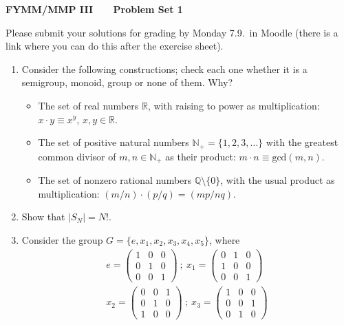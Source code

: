 \documentclass[12pt]{article}
\newcommand{\R} {\mathbb{R}}
\newcommand{\N} {\mathbb{N}}
\newcommand{\Q} {\mathbb{Q}}
\begin{document}
\normalsize

\baselineskip 14pt

\begin{center}
{\Large {\bf FYMM/MMP III \ \ \  Problem Set 1}}
\end{center}

\noindent
Please submit your solutions for grading by Monday 7.9.\ in Moodle (there is a link where you can do this after the exercise sheet).

\begin{enumerate}
\item Consider the following constructions; check each one whether it is a semigroup, monoid, group or
none of them. Why?
\begin{itemize}
\item The set of real numbers $\R$, with raising to power as multiplication:
$x\cdot y \equiv x^y$, $x,y\in \R$.
\item The set of positive natural numbers $\N_+=\{1,2,3,\ldots \}$ with the greatest common
divisor of $m,n\in \N_+$ as their product: $m\cdot n \equiv \text{gcd}(m,n)$.
\item The set of nonzero rational numbers $\Q\setminus\{0\}$, with the usual product
as multiplication: $(m/n) \cdot (p/q)
= (mp/nq)$.
\end{itemize}
\item Show that $|S_N|=N!$.
\item Consider the group $G=\{e,x_1,x_2,x_3,x_4,x_5\}$, where
\begin{eqnarray*}
e=\left( \begin{array}{ccc} 1 & 0 & 0 \\ 0 & 1 & 0 \\ 0 & 0 & 1
\end{array}\right) \ ; \
x_1 = \left( \begin{array}{ccc} 0 & 1 & 0 \\ 1 & 0 & 0 \\ 0 & 0 & 1
\end{array}\right) \\
x_2 = \left( \begin{array}{ccc} 0 & 0 & 1 \\ 0 & 1 & 0 \\ 1 & 0 & 0
\end{array}\right) \ ; \
x_3 = \left( \begin{array}{ccc} 1 & 0 & 0 \\ 0 & 0 & 1 \\ 0 & 1 & 0
\end{array}\right) \\

\end{eqnarray*}
\end{enumerate}
\end{document}
